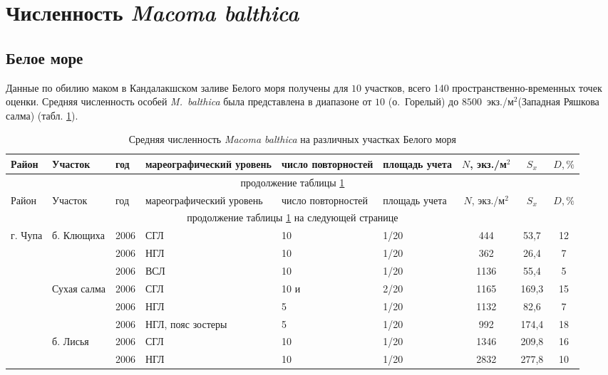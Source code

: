 
	\section{Численность {\it Macoma balthica}}
	\subsection{Белое море}
Данные по обилию маком в Кандалакшском заливе Белого моря получены для $10$ участков, всего 140 пространственно-временных точек оценки.
Средняя численность особей {\it M.~balthica} была представлена в диапазоне от $10$ (о.~Горелый) до $8500$~экз./м$^2$(Западная Ряшкова салма) (табл. \ref{tab:mean_N_White}).
	\begin{footnotesize}
    \begin{center}
	\begin{longtable}{|p{1.6cm}|p{2.3cm}|p{1cm}|p{2cm}|p{1.5cm}|p{1.3cm}|*{3}{c|}}
	\caption{Средняя численность {\it Macoma balthica} на различных участках Белого моря}\label{tab:mean_N_White}\\
	\hline
	Район & Участок & год & ма\-ре\-ографи\-ческий уровень & число повторностей & площадь учета & $N$, экз./м$^2$ & $S_x$  & $D, \%$ 
	\\ \hline \endfirsthead
	\hline
	\multicolumn{9}{|c|}{продолжение таблицы \ref{tab:mean_N_White}} \\ \hline
	Район & Участок & год & ма\-ре\-ографи\-ческий уровень & число повторностей & площадь учета & $N$, экз./м$^2$ & $S_x$  & $D, \%$ 
	\\ \hline \endhead
	\hline 
	\multicolumn{9}{|c|}{продолжение таблицы \ref{tab:mean_N_White} на следующей странице}
	\\ \hline \endfoot
	 \endlastfoot
	г. Чупа & б. Клющиха & 2006 & СГЛ & 10 & 1/20 & 444 & 53,7 & 12
		\\ \cline{3-9}
		 &  & 2006 & НГЛ & 10 & 1/20 & 362 & 26,4 & 7
		\\ \cline{3-9}
		 &  & 2006 & ВСЛ & 10 & 1/20 & 1136 & 55,4 & 5
		\\ \cline{2-9}
		 & Сухая салма & 2006 & СГЛ & 10 и & 2/20 & 1165 & 169,3 & 15
		\\ \cline{3-9}
		 &  & 2006 & НГЛ & 5 & 1/20 & 1132 & 82,6 & 7
		\\ \cline{3-9}
		 &  & 2006 & НГЛ, пояс зостеры & 5 & 1/20 & 992 & 174,4 & 18
		\\ \cline{2-9}
		 & б. Лисья & 2006 & СГЛ & 10 & 1/20 & 1346 & 209,8 & 16
		\\ \cline{3-9}
		 &  & 2006 & НГЛ & 10 & 1/20 & 2832 & 277,8 & 10

\end{longtable}
\end{center}
\end{footnotesize}
